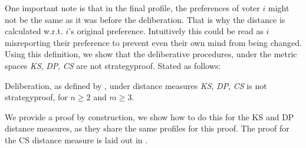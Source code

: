 One important note is that in the final profile, the
preferences of voter \(i\) might not be the same as it was
before the deliberation. That is why the distance is calculated
w.r.t. \(i\)'s original preference. Intuitively this could be
read as \(i\) misreporting their preference to prevent even
their own mind from being changed. Using this definition, we
show that the deliberative procedures, under the metric spaces
\emph{KS}, \emph{ DP}, \emph{ CS} are not strategyproof. Stated
as follows:

\begin{proposition}
	Deliberation, as defined by
	\citet{radDeliberationSinglePeakednessCoherent2021}, under distance
	measures \emph{KS}, \emph{ DP}, \emph{ CS} is not strategyproof, for $n
		\geq 2$ and $m \geq 3$.
\end{proposition}

We provide a proof by construction, we show how to do this for
the KS and DP distance measures, as they share the same profiles for this proof. The
proof for the CS distance measure is laid out in .

